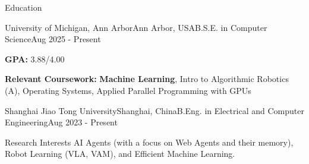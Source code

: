 \documentclass{resume} %
\begin{document}


\begin{rSection}{Education}

\begin{rSubsection}{University of Michigan, Ann Arbor}{Ann Arbor, USA}{B.S.E. in Computer Science}{Aug 2025 - Present} 
\item \textbf{GPA:} 3.88/4.00
\item \textbf{Relevant Coursework:} \textbf{Machine Learning}, Intro to Algorithmic Robotics (A),  Operating Systems, Applied Parallel Programming with GPUs
\end{rSubsection}

\begin{rSubsection}{Shanghai Jiao Tong University}{Shanghai, China}{B.Eng. in Electrical and Computer Engineering}{Aug 2023 - Present}
\end{rSubsection}
\end{rSection}

\begin{rSection}{Research Interests}
AI Agents (with a focus on Web Agents and their memory), Robot Learning (VLA, VAM), and Efficient Machine Learning.
\end{rSection}

\end{document}
